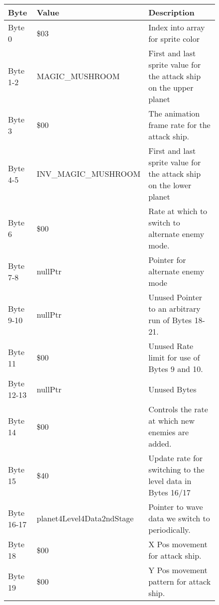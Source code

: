 \begin{figure}[H]
  {
  \setlength{\tabcolsep}{3.0pt}
  \setlength\cmidrulewidth{\heavyrulewidth} %
  \begin{adjustbox}{width=12cm}

\begin{tabular}{lll}
\toprule
 Byte       & Value                     & Description                                                         \\
\midrule
 Byte 0     & \$03                       & Index into array for sprite color                                   \\
 Byte 1-2   & MAGIC\_MUSHROOM            & First and last sprite value for the attack ship on the upper planet \\
 Byte 3     & \$00                       & The animation frame rate for the attack ship.                       \\
 Byte 4-5   & INV\_MAGIC\_MUSHROOM        & First and last sprite value for the attack ship on the lower planet \\
 Byte 6     & \$00                       & Rate at which to switch to alternate enemy mode.                    \\
 Byte 7-8   & nullPtr                   & Pointer for alternate enemy mode                                    \\
 Byte 9-10  & nullPtr                   & Unused Pointer to an arbitrary run of Bytes 18-21.                  \\
 Byte 11    & \$00                       & Unused Rate limit for use of Bytes 9 and 10.                        \\
 Byte 12-13 & nullPtr                   & Unused Bytes                                                        \\
 Byte 14    & \$00                       & Controls the rate at which new enemies are added.                   \\
 Byte 15    & \$40                       & Update rate for switching to the level data in Bytes 16/17          \\
 Byte 16-17 & planet4Level4Data2ndStage & Pointer to wave data we switch to periodically.                     \\
 Byte 18    & \$00                       & X Pos movement for attack ship.                                     \\
 Byte 19    & \$00                       & Y Pos movement pattern for attack ship.                             \\

\end{tabular}
\end{adjustbox}}
\end{figure}
